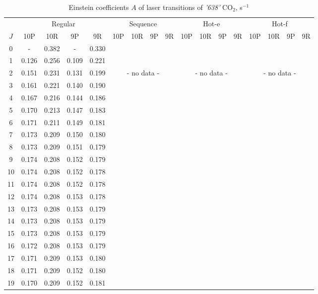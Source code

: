 \documentclass{report}
\begin{document}
\begin{table}
\centering
\caption{Einstein coefficients $A$ of laser transitions of \textit{'638'} CO$_2$, s$^{-1}$}
\label{table:A638}
\scriptsize
\begin{tabular}{|c|cccc|cccc|cccc|cccc|}
\hline
& \multicolumn{4}{c|}{Regular}& \multicolumn{4}{c|}{Sequence}& \multicolumn{4}{c|}{Hot-e}& \multicolumn{4}{c|}{Hot-f}\\
$J$ & 10P & 10R & 9P & 9R & 10P & 10R & 9P & 9R & 10P & 10R & 9P & 9R & 10P & 10R & 9P & 9R\\ 
\hline
0  &   -   & 0.382 &   -   & 0.330 & & & & & & & & & & & &\\
1  & 0.126 & 0.256 & 0.109 & 0.221 & & & & & & & & & & & &\\
2  & 0.151 & 0.231 & 0.131 & 0.199 & \multicolumn{4}{c|}{- no data -}& \multicolumn{4}{c|}{- no data -}& \multicolumn{4}{c|}{- no data -}\\
3  & 0.161 & 0.221 & 0.140 & 0.190 & & & & & & & & & & & &\\
4  & 0.167 & 0.216 & 0.144 & 0.186 & & & & & & & & & & & &\\
5  & 0.170 & 0.213 & 0.147 & 0.183 & & & & & & & & & & & &\\
6  & 0.171 & 0.211 & 0.149 & 0.181 & & & & & & & & & & & &\\
7  & 0.173 & 0.209 & 0.150 & 0.180 & & & & & & & & & & & &\\
8  & 0.173 & 0.209 & 0.151 & 0.179 & & & & & & & & & & & &\\
9  & 0.174 & 0.208 & 0.152 & 0.179 & & & & & & & & & & & &\\
10 & 0.174 & 0.208 & 0.152 & 0.178 & & & & & & & & & & & &\\
11 & 0.174 & 0.208 & 0.152 & 0.178 & & & & & & & & & & & &\\
12 & 0.174 & 0.208 & 0.153 & 0.178 & & & & & & & & & & & &\\
13 & 0.173 & 0.208 & 0.153 & 0.179 & & & & & & & & & & & &\\
14 & 0.173 & 0.208 & 0.153 & 0.179 & & & & & & & & & & & &\\
15 & 0.173 & 0.208 & 0.153 & 0.179 & & & & & & & & & & & &\\
16 & 0.172 & 0.208 & 0.153 & 0.179 & & & & & & & & & & & &\\
17 & 0.171 & 0.209 & 0.153 & 0.180 & & & & & & & & & & & &\\
18 & 0.171 & 0.209 & 0.152 & 0.180 & & & & & & & & & & & &\\
19 & 0.170 & 0.209 & 0.152 & 0.181 & & & & & & & & & & & &\\

\end{tabular}
\end{table}
\end{document}
